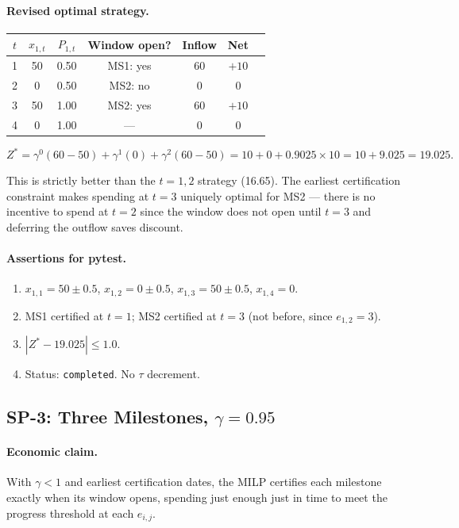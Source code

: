 \documentclass[11pt, a4paper]{article}
\begin{document}
\paragraph{Revised optimal strategy.}
\begin{center}
\begin{tabular}{ccccccc}
\toprule
$t$ & $x_{1,t}$ & $P_{1,t}$ & Window open? & Inflow & Net\\
\midrule
1 & 50 & 0.50 & MS1: yes & 60  & $+10$\\
2 &  0 & 0.50 & MS2: no  &  0  & $0$\\
3 & 50 & 1.00 & MS2: yes & 60  & $+10$\\
4 &  0 & 1.00 & ---      &  0  & $0$\\
\bottomrule
\end{tabular}
\end{center}

\[
  Z^* = \gamma^0(60-50) + \gamma^1(0) + \gamma^2(60-50)
      = 10 + 0 + 0.9025\times10 = 10+9.025 = \mathbf{19.025}.
\]

This is strictly better than the $t=1,2$ strategy (16.65). The earliest
certification constraint makes spending at $t=3$ uniquely optimal for
MS2 --- there is no incentive to spend at $t=2$ since the window does
not open until $t=3$ and deferring the outflow saves discount.

\paragraph{Assertions for pytest.}
\begin{enumerate}[label=A\arabic*.]
  \item $x_{1,1}=50\pm0.5$, $x_{1,2}=0\pm0.5$, $x_{1,3}=50\pm0.5$,
    $x_{1,4}=0$.
  \item MS1 certified at $t=1$; MS2 certified at $t=3$ (not before,
    since $e_{1,2}=3$).
  \item $|Z^*-19.025|\leq1.0$.
  \item Status: \texttt{completed}. No $\tau$ decrement.
\end{enumerate}

\subsection{SP-3: Three Milestones, $\gamma=0.95$}

\paragraph{Economic claim.}
With $\gamma<1$ and earliest certification dates, the MILP certifies
each milestone exactly when its window opens, spending just enough just
in time to meet the progress threshold at each $e_{i,j}$.
\end{document}
